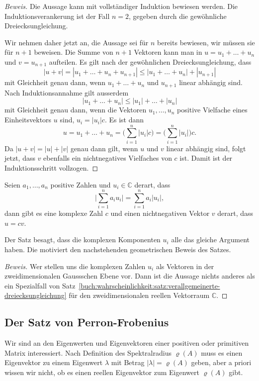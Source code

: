 \begin{proof}[Beweis]
Die Aussage kann mit vollständiger Induktion bewiesen werden.
Die Induktionsverankerung ist der Fall $n=2$, gegeben durch die
gewöhnliche Dreiecksungleichung.

Wir nehmen daher jetzt an, die Aussage sei für $n$ bereits bewiesen,
wir müssen sie für $n+1$ beweisen.
Die Summe von $n+1$ Vektoren kann man in $u=u_1+\dots+u_n$ und $v=u_{n+1}$
aufteilen.
Es gilt nach der gewöhnlichen Dreiecksungleichung, dass
\[
|u+v|
=
|u_1+\dots+u_n+u_{n+1}|
\le
|u_1+\dots+u_n|+|u_{n+1}|
\]
mit Gleichheit genau dann, wenn $u_1+\dots+u_n$ und $u_{n+1}$
linear abhängig sind.
Nach Induktionsannahme gilt ausserdem
\[
|u_1+\dots+u_n| \le |u_1|+\dots+|u_n|
\]
mit Gleichheit genau dann, wenn die Vektoren $u_1,\dots,u_n$
positive Vielfache eines Einheitsvektors $u$ sind, $u_i=|u_i|c$.
Es ist dann
\[
u=u_1+\dots+u_n
=
\biggl(\sum_{i=1}^n |u_i|c\biggr)
=
\biggl(\sum_{i=1}^n |u_i|\biggr)c.
\]
Da $|u+v|=|u|+|v|$ genau dann gilt, wenn $u$ und $v$ linear abhängig sind,
folgt jetzt, dass $v$ ebenfalls ein nichtnegatives Vielfaches von $c$ ist.
Damit ist der Induktionsschritt vollzogen.
\end{proof}

\begin{satz}
\label{buch:wahrscheinlichkeit:satz:verallgdreieckC}
Seien $a_1,\dots,a_n$ positive Zahlen und $u_i\in\mathbb C$ derart,
dass 
\[
\biggl|
\sum_{i=1}^n a_i u_i
\biggr|
=
\sum_{i=1}^n a_i |u_i|,
\]
dann gibt es eine komplexe Zahl $c$ und einen nichtnegativen Vektor $v$
derart, dass $u=cv$.
\end{satz}

Der Satz besagt, dass die komplexen Komponenten $u_i$ alle das gleiche
Argument haben.
Die motiviert den nachstehenden geometrischen Beweis des Satzes.

\begin{proof}[Beweis]
Wer stellen uns die komplexen Zahlen $u_i$ als Vektoren in der
zweidimensionalen Gauss\-schen Ebene vor.
Dann ist die Aussage nichts anderes als ein Spezialfall von
Satz~\ref{buch:wahrscheinlichkeit:satz:verallgemeinerte-dreiecksungleichung}
für den zweidimensionalen reellen Vektorraum $\mathbb{C}$.
\end{proof}


%
%
\subsection{Der Satz von Perron-Frobenius
\label{buch:subsection:der-satz-von-perron-frobenius}}
Wir sind an den Eigenwerten und Eigenvektoren einer positiven
oder primitiven Matrix interessiert.
Nach Definition des Spektralradius $\varrho(A)$ muss es einen Eigenvektor 
zu einem Eigenwert $\lambda$ mit Betrag $|\lambda|=\varrho(A)$ geben,
aber a priori wissen wir nicht, ob es einen reellen Eigenvektor zum
Eigenwert $\varrho(A)$ gibt.


